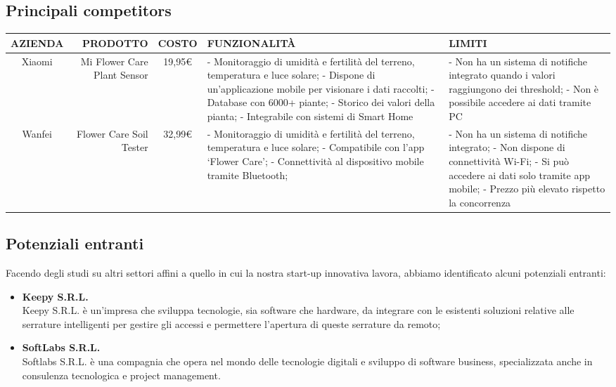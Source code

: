 \subsection{Principali competitors}
\begin{center}
\begin{tabularx}{\textwidth}{| S | D | S | L | L |}
  \hline
  \textbf{AZIENDA} &
  \textbf{PRODOTTO} &
  \textbf{COSTO} &
  \textbf{FUNZIONALIT\`A} &
  \textbf{LIMITI} \\	
  \hline
 Xiaomi & Mi Flower Care Plant Sensor & 19,95€ &
- Monitoraggio di umidità e fertilità del terreno, temperatura e luce solare;\newline
- Dispone di un’applicazione mobile per visionare i dati raccolti;\newline
- Database con 6000+ piante;\newline
- Storico dei valori della pianta;\newline
- Integrabile con sistemi di Smart Home & 
- Non ha un sistema di notifiche integrato quando i valori raggiungono dei threshold;\newline
- Non è possibile accedere ai dati tramite PC \\	\hline
 Wanfei & Flower Care Soil Tester & 32,99€ &
- Monitoraggio di umidità e fertilità del terreno, temperatura e luce solare;\newline
- Compatibile con l’app ‘Flower Care’;\newline
- Connettività al dispositivo mobile tramite Bluetooth; &
- Non ha un sistema di notifiche integrato;\newline
- Non dispone di connettività Wi-Fi;\newline
- Si può accedere ai dati solo tramite app mobile;\newline
- Prezzo più elevato rispetto la concorrenza \\	\hline
\end{tabularx}
\end{center}

\subsection{Potenziali entranti}

Facendo degli studi su altri settori affini a quello in cui la nostra start-up innovativa lavora, abbiamo identificato alcuni potenziali entranti:
\begin{itemize}
	\item \textbf{Keepy S.R.L.}\\
	Keepy S.R.L. è un’impresa che sviluppa tecnologie, sia software che hardware, da integrare con le esistenti soluzioni relative alle serrature intelligenti per gestire gli accessi e permettere l’apertura di queste serrature da remoto;
	\item \textbf{SoftLabs S.R.L.}\\
	Softlabs S.R.L. è una compagnia che opera nel mondo delle tecnologie digitali e sviluppo di software business, specializzata anche in consulenza tecnologica e project management. 
\end{itemize}

